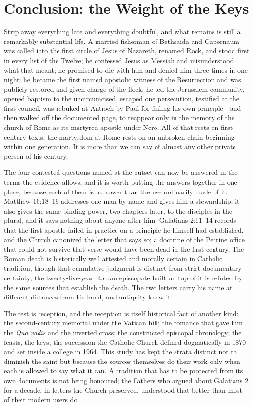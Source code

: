 \section{Conclusion: the Weight of the Keys}

Strip away everything late and everything doubtful, and what remains is
still a remarkably substantial life. A married fisherman of Bethsaida and
Capernaum was called into the first circle of Jesus of Nazareth, renamed
Rock, and stood first in every list of the Twelve; he confessed Jesus as
Messiah and misunderstood what that meant; he promised to die with him and
denied him three times in one night; he became the first named apostolic
witness of the Resurrection and was publicly restored and given charge of
the flock; he led the Jerusalem community, opened baptism to the
uncircumcised, escaped one persecution, testified at the first council,
was rebuked at Antioch by Paul for failing his own principle---and then
walked off the documented page, to reappear only in the memory of the
church of Rome as its martyred apostle under Nero. All of that rests on
first-century texts; the martyrdom at Rome rests on an unbroken chain
beginning within one generation. It is more than we can say of almost any
other private person of his century.

The four contested questions named at the outset can now be answered in the
terms the evidence allows, and it is worth putting the answers together in
one place, because each of them is narrower than the use ordinarily made of
it. Matthew 16:18--19 addresses one man by name and gives him a stewardship;
it also gives the same binding power, two chapters later, to the disciples in
the plural, and it says nothing about anyone after him. Galatians 2:11--14
records that the first apostle failed in practice on a principle he himself
had established, and the Church canonized the letter that says so; a doctrine
of the Petrine office that could not survive that verse would have been dead
in the first century. The Roman death is historically well attested and
morally certain in Catholic tradition, though that cumulative judgment is
distinct from strict documentary certainty; the twenty-five-year Roman
episcopate built on top of it is refuted by the same sources that establish
the death.
The two letters carry his name at different distances from his hand, and
antiquity knew it.

The rest is reception, and the reception is itself historical fact of another
kind: the second-century memorial under the Vatican hill; the romance that
gave him the \textit{Quo vadis} and the inverted cross; the constructed
episcopal chronology; the feasts, the keys, the succession the Catholic
Church defined dogmatically in 1870 and set inside a college in 1964. This
study has kept the strata distinct not to diminish the saint but because the
sources themselves do their work only when each is allowed to say what it
can. A tradition that has to be protected from its own documents is not being
honoured; the Fathers who argued about Galatians 2 for a decade, in letters
the Church preserved, understood that better than most of their modern
users do.

